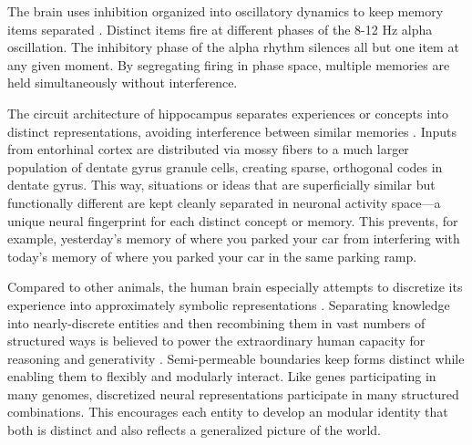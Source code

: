\documentclass[12pt]{article}
\begin{document}

The brain uses inhibition organized into oscillatory dynamics to keep memory items separated \citep{lisman2013theta, jensen2010shaping, roux2014working, klimesch2007eeg}. Distinct items fire at different phases of the 8-12 Hz alpha oscillation. The inhibitory phase of the alpha rhythm silences all but one item at any given moment. By segregating firing in phase space, multiple memories are held simultaneously without interference. 

The circuit architecture of hippocampus separates experiences or concepts into distinct representations, avoiding interference between similar memories \citep{mcclelland1995why, marr1971simple, mcnaughton1987hippocampal, treves1994computational, muller1987effects, leutgeb2007pattern, colgin2008frequency}. Inputs from entorhinal cortex are distributed via mossy fibers to a much larger population of dentate gyrus granule cells, creating sparse, orthogonal codes in dentate gyrus. This way, situations or ideas that are superficially similar but functionally different are kept cleanly separated in neuronal activity space---a unique neural fingerprint for each distinct concept or memory. This prevents, for example, yesterday's memory of where you parked your car from interfering with today's memory of where you parked your car in the same parking ramp. 

Compared to other animals, the human brain especially attempts to discretize its experience into approximately symbolic representations \citep{dehaene2022symbols, touretzky1988distributed, smolensky1990tensor, behrens2018cognitive}. Separating knowledge into nearly-discrete entities and then recombining them in vast numbers of structured ways is believed to power the extraordinary human capacity for reasoning and generativity \citep{fodor1975language, pinker1994language, lake2015human, chomsky1957syntactic, kurth2023replay, schacter2007remembering}. Semi-permeable boundaries keep forms distinct while enabling them to flexibly and modularly interact. Like genes participating in many genomes, discretized neural representations participate in many structured combinations. This encourages each entity to develop an modular identity that both is distinct and also reflects a generalized picture of the world.
\end{document}
